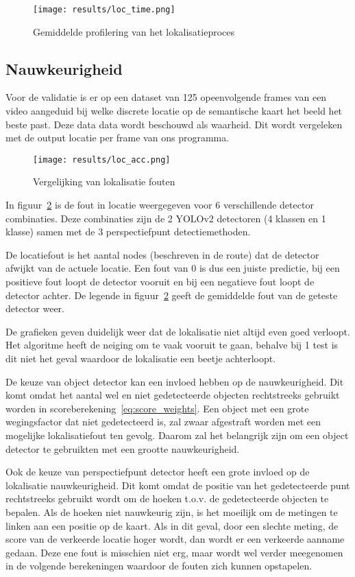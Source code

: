\begin{figure}[h]
    \centering
    \texttt{[image: results/loc\_time.png]}
    \caption{Gemiddelde profilering van het lokalisatieproces}
    \label{fig:loc_time}
\end{figure}


\subsection{Nauwkeurigheid}
Voor de validatie is er op een dataset van 125 opeenvolgende frames van een video aangeduid bij welke discrete locatie op de semantische kaart
het beeld het beste past.
Deze data data wordt beschouwd als waarheid.
Dit wordt vergeleken met de output locatie per frame van ons programma.

\begin{figure}[h]
    \texttt{[image: results/loc\_acc.png]}
    \caption{Vergelijking van lokalisatie fouten}
    \label{fig:loc_acc}
\end{figure}

In figuur~\ref{fig:loc_acc} is de fout in locatie weergegeven voor 6 verschillende detector combinaties.
Deze combinaties zijn de 2 YOLOv2 detectoren (4 klassen en 1 klasse) samen met de 3 perspectiefpunt detectiemethoden.

De locatiefout is het aantal nodes (beschreven in de route) dat de detector afwijkt van de actuele locatie.
Een fout van 0 is dus een juiste predictie, bij een positieve fout loopt de detector vooruit en bij een negatieve fout loopt de detector achter.
De legende in figuur~\ref{fig:loc_acc} geeft de gemiddelde fout van de geteste detector weer.

De grafieken geven duidelijk weer dat de lokalisatie niet altijd even goed verloopt.
Het algoritme heeft de neiging om te vaak vooruit te gaan, behalve bij 1 test is dit niet het geval waardoor de lokalisatie een beetje achterloopt.

De keuze van object detector kan een invloed hebben op de nauwkeurigheid. Dit komt omdat het aantal wel en niet gedetecteerde objecten
rechtstreeks gebruikt worden in scoreberekening~\ref{eq:score_weights}.
Een object met een grote wegingsfactor dat niet gedetecteerd is, zal zwaar afgestraft worden met een mogelijke lokalisatiefout ten gevolg.
Daarom zal het belangrijk zijn om een object detector te gebruikten met een grootte nauwkeurigheid.

Ook de keuze van perspectiefpunt detector heeft een grote invloed op de lokalisatie nauwkeurigheid.
Dit komt omdat de positie van het gedetecteerde punt rechtstreeks gebruikt wordt om de hoeken t.o.v. de gedetecteerde objecten te bepalen.
Als de hoeken niet nauwkeurig zijn, is het moeilijk om de metingen te linken aan een positie op de kaart.
Als in dit geval, door een slechte meting, de score van de verkeerde locatie hoger wordt, dan wordt er een verkeerde aanname gedaan.
Deze ene fout is misschien niet erg, maar wordt wel verder meegenomen in de volgende berekeningen waardoor de fouten zich kunnen opstapelen.

